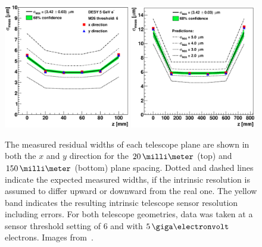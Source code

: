 \begin{figure}[tbp]
  \centering
  \includegraphics[width=0.49\textwidth]{figures/20} %
  \includegraphics[width=0.49\textwidth]{figures/150} %
  \caption[The measured residual widths of each telescope plane.]{The measured residual widths of each telescope plane are shown in both the $x$ and $y$ direction for the $20\,\milli\meter$ (top)
   and $150\,\milli\meter$ (bottom) plane spacing.
  Dotted and dashed lines indicate the expected measured widths, if the intrinsic resolution is assumed to differ upward or downward from the real one. 
  The yellow band indicates the resulting intrinsic telescope sensor resolution including errors.
  For both telescope geometries, data was taken at a sensor threshold setting of $6$ and with $5\,\giga\electronvolt$ electrons.
  Images from~\cite{ref:thomas}.}
  \label{fig:smiley}
\end{figure}



